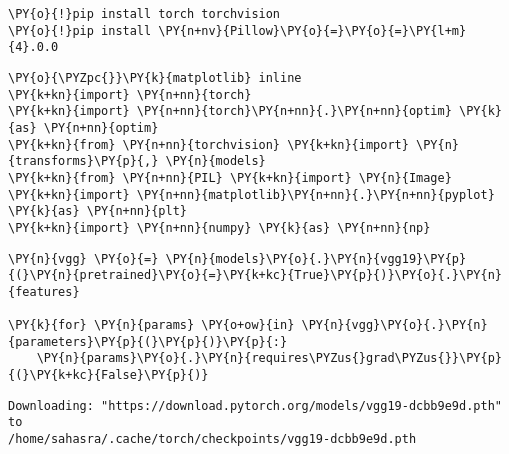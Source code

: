     \begin{tcolorbox}[breakable, size=fbox, boxrule=1pt, pad at break*=1mm,colback=cellbackground, colframe=cellborder]
\begin{Verbatim}[commandchars=\\\{\}]
\PY{o}{!}pip install torch torchvision
\PY{o}{!}pip install \PY{n+nv}{Pillow}\PY{o}{=}\PY{o}{=}\PY{l+m}{4}.0.0
\end{Verbatim}
\end{tcolorbox}  
    
    \begin{tcolorbox}[breakable, size=fbox, boxrule=1pt, pad at break*=1mm,colback=cellbackground, colframe=cellborder]
\begin{Verbatim}[commandchars=\\\{\}]
\PY{o}{\PYZpc{}}\PY{k}{matplotlib} inline
\PY{k+kn}{import} \PY{n+nn}{torch}
\PY{k+kn}{import} \PY{n+nn}{torch}\PY{n+nn}{.}\PY{n+nn}{optim} \PY{k}{as} \PY{n+nn}{optim}
\PY{k+kn}{from} \PY{n+nn}{torchvision} \PY{k+kn}{import} \PY{n}{transforms}\PY{p}{,} \PY{n}{models}
\PY{k+kn}{from} \PY{n+nn}{PIL} \PY{k+kn}{import} \PY{n}{Image}
\PY{k+kn}{import} \PY{n+nn}{matplotlib}\PY{n+nn}{.}\PY{n+nn}{pyplot} \PY{k}{as} \PY{n+nn}{plt}
\PY{k+kn}{import} \PY{n+nn}{numpy} \PY{k}{as} \PY{n+nn}{np}
\end{Verbatim}
\end{tcolorbox}

    \begin{tcolorbox}[breakable, size=fbox, boxrule=1pt, pad at break*=1mm,colback=cellbackground, colframe=cellborder]
\begin{Verbatim}[commandchars=\\\{\}]
\PY{n}{vgg} \PY{o}{=} \PY{n}{models}\PY{o}{.}\PY{n}{vgg19}\PY{p}{(}\PY{n}{pretrained}\PY{o}{=}\PY{k+kc}{True}\PY{p}{)}\PY{o}{.}\PY{n}{features}

\PY{k}{for} \PY{n}{params} \PY{o+ow}{in} \PY{n}{vgg}\PY{o}{.}\PY{n}{parameters}\PY{p}{(}\PY{p}{)}\PY{p}{:}
    \PY{n}{params}\PY{o}{.}\PY{n}{requires\PYZus{}grad\PYZus{}}\PY{p}{(}\PY{k+kc}{False}\PY{p}{)}
\end{Verbatim}
\end{tcolorbox}

    \begin{Verbatim}[commandchars=\\\{\}]
Downloading: "https://download.pytorch.org/models/vgg19-dcbb9e9d.pth" to
/home/sahasra/.cache/torch/checkpoints/vgg19-dcbb9e9d.pth
    \end{Verbatim}

